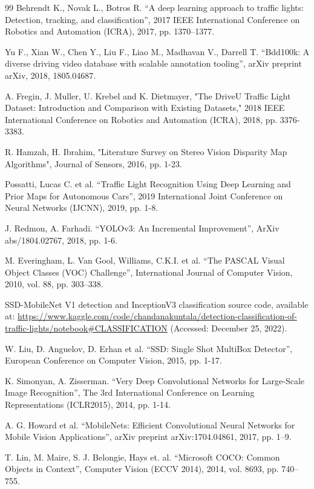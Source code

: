 \documentclass{misisarticle}
\begin{document}
\begin{thebibliography}{99}
 Behrendt K., Novak L., Botros R. “A deep learning approach to traffic lights: Detection, tracking, and classification”, 2017 IEEE International Conference on Robotics and Automation (ICRA), 2017, pp. 1370–1377.

 Yu F., Xian W., Chen Y., Liu F., Liao M., Madhavan V., Darrell T. “Bdd100k: A diverse driving video database with scalable annotation tooling”, arXiv preprint arXiv, 2018, 1805.04687.

 A. Fregin, J. Muller, U. Krebel and K. Dietmayer, "The DriveU Traffic Light Dataset: Introduction and Comparison with Existing Datasets," 2018 IEEE International Conference on Robotics and Automation (ICRA), 2018, pp. 3376-3383.

 R. Hamzah, H. Ibrahim, "Literature Survey on Stereo Vision Disparity Map Algorithms", Journal of Sensors, 2016, pp. 1-23.

 Possatti, Lucas C. et al. “Traffic Light Recognition Using Deep Learning and Prior Maps for Autonomous Cars”, 2019 International Joint Conference on Neural Networks (IJCNN), 2019, pp. 1-8.

 J. Redmon, A. Farhadi. “YOLOv3: An Incremental Improvement”, ArXiv abs/1804.02767, 2018, pp. 1-6.

 M. Everingham, L. Van Gool, Williams, C.K.I. et al. “The PASCAL Visual Object Classes (VOC) Challenge”, International Journal of Computer Vision, 2010, vol. 88, pp. 303–338.

 SSD-MobileNet V1 detection and InceptionV3 classification source code, available at: \url{https://www.kaggle.com/code/chandanakuntala/detection-classification-of-traffic-lights/notebook\#CLASSIFICATION} (Accessed: December 25, 2022).

 W. Liu, D. Anguelov, D. Erhan et al. “SSD: Single Shot MultiBox Detector”, European Conference on Computer Vision, 2015, pp. 1-17.

 K. Simonyan, A. Zisserman. “Very Deep Convolutional Networks for Large-Scale Image Recognition”, The 3rd International Conference on Learning Representations (ICLR2015), 2014, pp. 1-14.

 A. G. Howard et al. “MobileNets: Efficient Convolutional Neural Networks for Mobile Vision Applications”, arXiv preprint arXiv:1704.04861, 2017, pp. 1–9.

 T. Lin, M. Maire, S. J. Belongie, Hays et. al. “Microsoft COCO: Common Objects in Context”, Computer Vision (ECCV 2014), 2014, vol. 8693, pp. 740–755.


\end{thebibliography}
\end{document}

